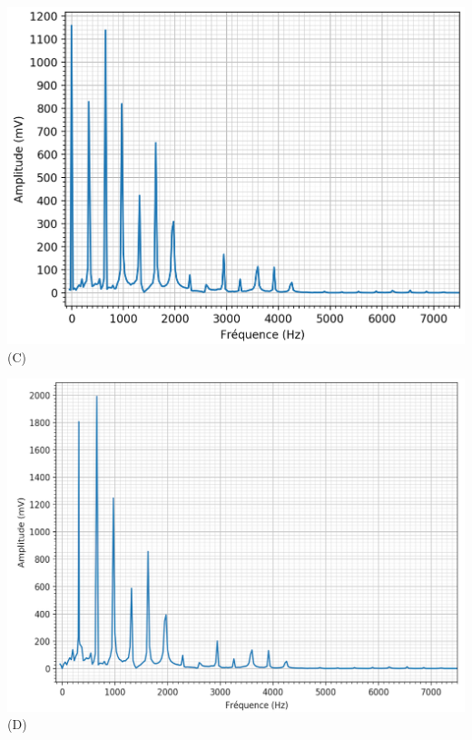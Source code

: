 \documentclass[a4paper,french,bookmarks]{article}
\begin{document}
\begin{center}
	\begin{minipage}[c]{0.48\linewidth}
		\centering
		\includegraphics[width=0.98\linewidth]{dm6fig/Fig-spectre5.png}\\
		(C)
	\end{minipage}
	\hfill
	\begin{minipage}[c]{0.48\linewidth}
		\centering
		\includegraphics[width=0.98\linewidth]{dm6fig/Fig-spectre3.png}\\
		(D)
	\end{minipage}
	
	\label{spectre2}
\end{center}
\end{document}
